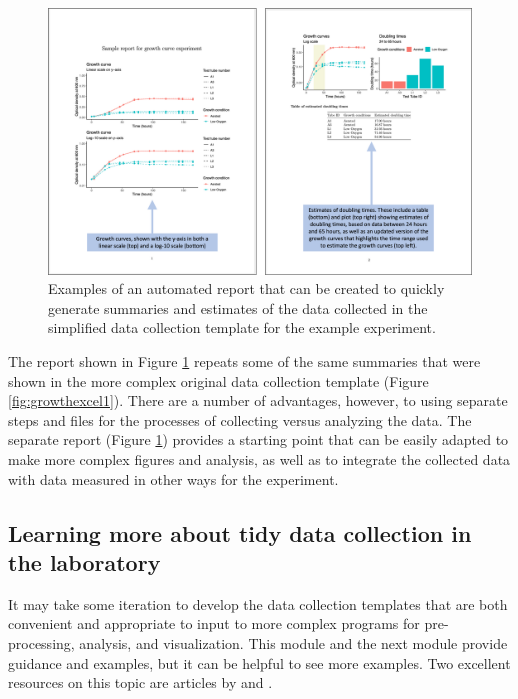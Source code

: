 \documentclass[]{tufte-book}
\begin{document}
\begin{figure}
\includegraphics[width=\textwidth]{figures/growth_curve_report} \caption[Examples of an automated report that can be created to quickly generate summaries and estimates of the data collected in the simplified data collection template for the example experiment]{Examples of an automated report that can be created to quickly generate summaries and estimates of the data collected in the simplified data collection template for the example experiment.}\label{fig:growthreport1}
\end{figure}

The report shown in Figure \ref{fig:growthreport1} repeats some of the same summaries
that were shown in the more complex original data collection template
(Figure \ref{fig:growthexcel1}). There are a number of advantages, however, to using
separate steps and files for the processes of collecting versus analyzing the data.
The separate report (Figure \ref{fig:growthreport1}) provides a starting point that can
be easily adapted to make more complex figures and analysis, as well as to integrate
the collected data with data measured in other ways for the experiment.

\subsection{Learning more about tidy data collection in the laboratory}\label{learning-more-about-tidy-data-collection-in-the-laboratory}

It may take some iteration to develop the data collection templates that are both
convenient and appropriate to input to more complex programs for pre-processing,
analysis, and visualization. This module and the next module provide guidance and
examples, but it can be helpful to see more examples. Two excellent resources on this
topic are articles by \citet{ellis2018share} and \citet{broman2018data}.
\end{document}
